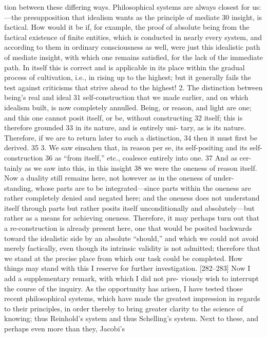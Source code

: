 tion between these differing ways. Philosophical systems are always closest for
us:—the presupposition that idealism wants as the principle of mediate 30
insight, is factical. How would it be if, for example, the proof of absolute being
from the factical existence of finite entities, which is conducted in nearly every
system, and according to them in ordinary consciousness as well, were just this
idealistic path of mediate insight, with which one remains satisfied, for the
lack of the immediate path. In itself this is correct and is applicable in its place
within the gradual process of cultivation, i.e., in rising up to the highest; but
it generally fails the test against criticisms that strive ahead to the highest! 2.
The distinction between being’s real and ideal 31 self-construction that we
made earlier, and on which idealism built, is now completely annulled. Being,
or reason, and light are one; and this one cannot posit itself, or be, without
constructing 32 itself; this is therefore grounded 33 in its nature, and is entirely uni-
tary, as is its nature. Therefore, if we are to return later to such a distinction, 34
then it must first be derived. 35
3. We saw {einsahen} that, in reason per se, its self-positing and its self-
construction 36 as “from itself,” etc., coalesce entirely into one. 37 And as cer-
tainly as we saw into this, in this insight 38 we were the oneness of reason itself.
Now a duality still remains here, not however as in the oneness of under-
standing, whose parts are to be integrated—since parts within the oneness
are rather completely denied and negated here; and the oneness does not
understand itself through parts but rather posits itself unconditionally and
absolutely—but rather as a means for achieving oneness. Therefore, it may
perhaps turn out that a re-construction is already present here, one that
would be posited backwards toward the idealistic side by an absolute
“should,” and which we could not avoid merely factically, even though its
intrinsic validity is not admitted; therefore that we stand at the precise place
from which our task could be completed. How things may stand with this I
reserve for further investigation.
[282–283] Now I add a supplementary remark, with which I did not pre-
viously wish to interrupt the course of the inquiry. As the opportunity has
arisen, I have tested those recent philosophical systems, which have made the
greatest impression in regards to their principles, in order thereby to bring
greater clarity to the science of knowing; thus Reinhold’s system and thus
Schelling’s system. Next to these, and perhaps even more than they, Jacobi’s
